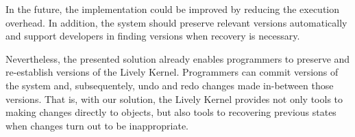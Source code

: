 In the future, the implementation could be improved by reducing the execution overhead.
In addition, the system should preserve relevant versions automatically and support developers in finding versions when recovery is necessary.

Nevertheless, the presented solution already enables programmers to preserve and re-establish versions of the Lively Kernel.
Programmers can commit versions of the system and, subsequentely, undo and redo changes made in-between those versions.
That is, with our solution, the Lively Kernel provides not only tools to making changes directly to objects, but also tools to recovering previous states when changes turn out to be inappropriate.

% 
% 
% 
% 
% 
% 
% 


% 



